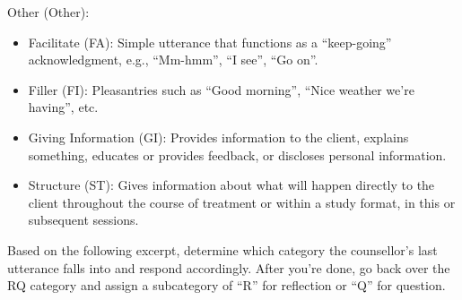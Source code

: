 \begin{tcolorbox}
	Other (Other):
	\begin{itemize}[itemsep=0pt, parsep=0pt]
		\item Facilitate (FA): Simple utterance that functions as a ``keep-going'' acknowledgment, e.g., ``Mm-hmm'', ``I see'', ``Go on''.
		\item Filler (FI): Pleasantries such as ``Good morning'', ``Nice weather we're having'', etc.
		\item Giving Information (GI): Provides information to the client, explains something, educates or provides feedback, or discloses personal information.
		\item Structure (ST): Gives information about what will happen directly to the client throughout the course of treatment or within a study format, in this or subsequent sessions.
	\end{itemize}

	Based on the following excerpt, determine which category the counsellor's last utterance falls into and respond accordingly. After you're done, go back over the RQ category and assign a subcategory of ``R'' for reflection or ``Q'' for question.
\end{tcolorbox}



